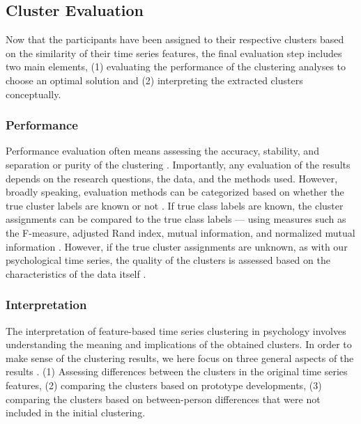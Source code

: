 \documentclass[man, 12pt, a4paper, mask, floatsintext]{apa7}
\theoremstyle{break}
\theoremstyle{plain}
\begin{document}




\subsection{Cluster Evaluation}
Now that the participants have been assigned to their respective clusters based on the similarity of their time series features, the final evaluation step includes two main elements, (1) evaluating the performance of the clustering analyses to choose an optimal solution and (2) interpreting the extracted clusters conceptually. 

\subsubsection{Performance}
Performance evaluation often means assessing the accuracy, stability, and separation or purity of the clustering \citep{keogh2003}. Importantly, any evaluation of the results depends on the research questions, the data, and the methods used. However, broadly speaking, evaluation methods can be categorized based on whether the true cluster labels are known or not \citep{saxena2017}. If true class labels are known, the cluster assignments can be compared to the true class labels --- using measures such as the F-measure, adjusted Rand index, mutual information, and normalized mutual information \citep[i.e., external evaluation; e.g.,][]{liao2005}. However, if the true cluster assignments are unknown, as with our psychological time series, the quality of the clusters is assessed based on the characteristics of the data itself \citep[i.e., internal evaluation; e.g.,][]{Aghabozorgi2015}. 



\subsubsection{Interpretation}
The interpretation of feature-based time series clustering in psychology involves understanding the meaning and implications of the obtained clusters. In order to make sense of the clustering results, we here focus on three general aspects of the results \citep{kaufman1990}. (1) Assessing differences between the clusters in the original time series features, (2) comparing the clusters based on prototype developments, (3) comparing the clusters based on between-person differences that were not included in the initial clustering.
\end{document}
